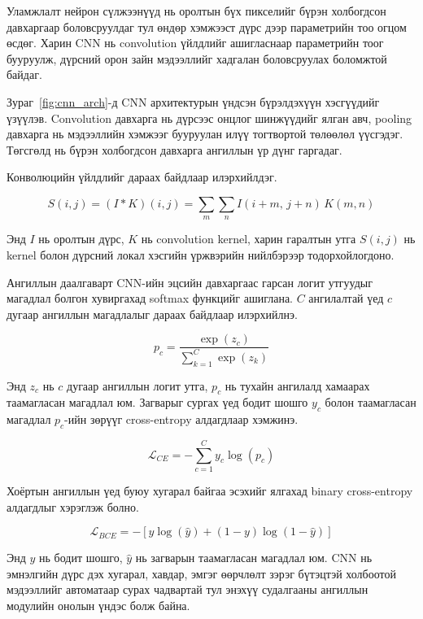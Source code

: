 Уламжлалт нейрон сүлжээнүүд нь оролтын бүх пикселийг бүрэн холбогдсон давхаргаар боловсруулдаг тул өндөр хэмжээст дүрс дээр параметрийн тоо огцом өсдөг. Харин CNN нь convolution үйлдлийг ашигласнаар параметрийн тоог бууруулж, дүрсний орон зайн мэдээллийг хадгалан боловсруулах боломжтой байдаг.

Зураг~\ref{fig:cnn_arch}-д CNN архитектурын үндсэн бүрэлдэхүүн хэсгүүдийг үзүүлэв. Convolution давхарга нь дүрсээс онцлог шинжүүдийг ялган авч, pooling давхарга нь мэдээллийн хэмжээг бууруулан илүү тогтвортой төлөөлөл үүсгэдэг. Төгсгөлд нь бүрэн холбогдсон давхарга ангиллын үр дүнг гаргадаг.

Конволюцийн үйлдлийг дараах байдлаар илэрхийлдэг.

\begin{equation}
    S(i,j) = (I * K)(i,j) = \sum_{m}\sum_{n} I(i+m,\, j+n)\, K(m,n)
    \label{eq:convolution}
\end{equation}

Энд $I$ нь оролтын дүрс, $K$ нь convolution kernel, харин гаралтын утга $S(i,j)$ нь kernel болон дүрсний локал хэсгийн үржвэрийн нийлбэрээр тодорхойлогдоно.

Ангиллын даалгаварт CNN-ийн эцсийн давхаргаас гарсан логит утгуудыг магадлал болгон хувиргахад softmax функцийг ашиглана. $C$ ангилалтай үед $c$ дугаар ангиллын магадлалыг дараах байдлаар илэрхийлнэ.

\begin{equation}
    p_c = \frac{\exp(z_c)}{\sum_{k=1}^{C}\exp(z_k)}
    \label{eq:softmax}
\end{equation}

Энд $z_c$ нь $c$ дугаар ангиллын логит утга, $p_c$ нь тухайн ангилалд хамаарах таамагласан магадлал юм. Загварыг сургах үед бодит шошго $y_c$ болон таамагласан магадлал $p_c$-ийн зөрүүг cross-entropy алдагдлаар хэмжинэ.

\begin{equation}
    \mathcal{L}_{CE} = -\sum_{c=1}^{C} y_c \log(p_c)
    \label{eq:cross_entropy}
\end{equation}

Хоёртын ангиллын үед буюу хугарал байгаа эсэхийг ялгахад binary cross-entropy алдагдлыг хэрэглэж болно.

\begin{equation}
    \mathcal{L}_{BCE} = -\left[y\log(\hat{y}) + (1-y)\log(1-\hat{y})\right]
    \label{eq:bce}
\end{equation}

Энд $y$ нь бодит шошго, $\hat{y}$ нь загварын таамагласан магадлал юм. CNN нь эмнэлгийн дүрс дэх хугарал, хавдар, эмгэг өөрчлөлт зэрэг бүтэцтэй холбоотой мэдээллийг автоматаар сурах чадвартай тул энэхүү судалгааны ангиллын модулийн онолын үндэс болж байна.

